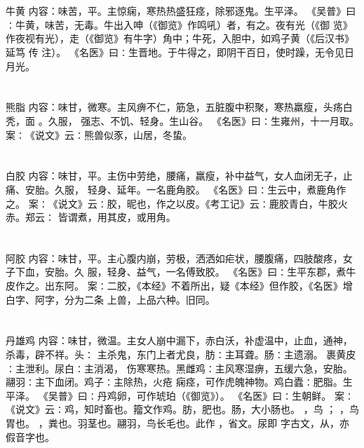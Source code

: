 \documentclass[12pt,UTF8]{ctexbook}
\begin{document}
\section{}牛黄
内容：味苦，平。主惊痫，寒热热盛狂痉，除邪逐鬼。生平泽。 
《吴普》曰∶牛黄，味苦，无毒。牛出入呻（《御览》作鸣吼）者，有之。夜有光（《御 
览》作夜视有光），走（《御览》有牛字）角中；牛死，入胆中，如鸡子黄（《后汉书》延笃 
传 
注）。 
《名医》曰∶生晋地。于牛得之，即阴干百日，使时躁，无令见日月光。 


\section{}熊脂
内容：味甘，微寒。主风痹不仁，筋急，五脏腹中积聚，寒热羸瘦，头疡白秃，面 。久服， 
强志、不饥、轻身。生山谷。 
《名医》曰∶生雍州，十一月取。 
案∶《说文》云∶熊兽似豕，山居，冬蛰。 


\section{}白胶
内容：味甘，平。主伤中劳绝，腰痛，羸瘦，补中益气，女人血闭无子，止痛、安胎。久服， 
轻身、延年。一名鹿角胶。 
《名医》曰∶生云中，煮鹿角作之。 
案∶《说文》云∶胶，昵也，作之以皮。《考工记》云∶鹿胶青白，牛胶火赤。郑云∶ 
皆谓煮，用其皮，或用角。 


\section{}阿胶
内容：味甘，平。主心腹内崩，劳极，洒洒如疟状，腰腹痛，四肢酸疼，女子下血，安胎。久 
服，轻身、益气，一名傅致胶。 
《名医》曰∶生平东郡，煮牛皮作之。出东阿。 
案∶二胶，《本经》不着所出，疑《本经》但作胶，《名医》增白字、阿字，分为二条 
上兽，上品六种。旧同。 


\section{}丹雄鸡
内容：味甘，微温。主女人崩中漏下，赤白沃，补虚温中，止血，通神，杀毒，辟不祥。头∶ 
主杀鬼，东门上者尤良，肪∶主耳聋。肠∶主遗溺。 裹黄皮∶主泄利。尿白∶主消渴， 
伤寒寒热。黑雌鸡∶主风寒湿痹，五缓六急，安胎。翮羽∶主下血闭。鸡子∶主除热，火疮 
痫痉，可作虎魄神物。鸡白蠹∶肥脂。生平泽。 
《吴普》曰∶丹鸡卵，可作琥珀（《御览》）。 
《名医》曰∶生朝鲜。 
案∶《说文》云∶鸡，知时畜也。籀文作鸡。肪，肥也。肠，大小肠也。 ，鸟 ； 
，鸟胃也。 ，粪也。羽茎也。翮羽，鸟长毛也。此作 ，省文。尿即 字古文，从，亦 
假音字也。 
\end{document}
